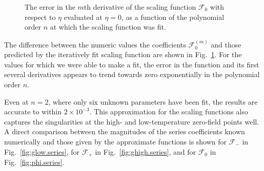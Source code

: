\documentclass[
aps,
pre,
preprint,
longbibliography,
floatfix
]{revtex4-2}
\begin{document}
\begin{figure}
  \caption{
    The error in the $m$th derivative of the scaling function $\mathcal F_0$
    with respect to $\eta$ evaluated at $\eta=0$, as a function of the
    polynomial order $n$ at which the scaling function was fit.
  } \label{fig:error}
\end{figure}

The difference between the numeric values the coefficients $\mathcal F_0^{(m)}$
and those predicted by the iteratively fit scaling function are shown in
Fig.~\ref{fig:error}. For the values for which we were able to make a fit, the
error in the function and its first several derivatives appears to trend
towards zero exponentially in the polynomial order $n$.

Even at $n=2$, where only six unknown parameters have been fit, the results are
accurate to within $2\times10^{-3}$. This approximation for the scaling
functions also captures the singularities at the high- and low-temperature
zero-field points well. A direct comparison between the magnitudes of the
series coefficients known numerically and those given by the approximate
functions is shown for $\mathcal F_-$ in Fig.~\ref{fig:glow.series}, for
$\mathcal F_+$ in Fig.~\ref{fig:ghigh.series}, and for $\mathcal F_0$ in
Fig.~\ref{fig:phi.series}.
\end{document}
